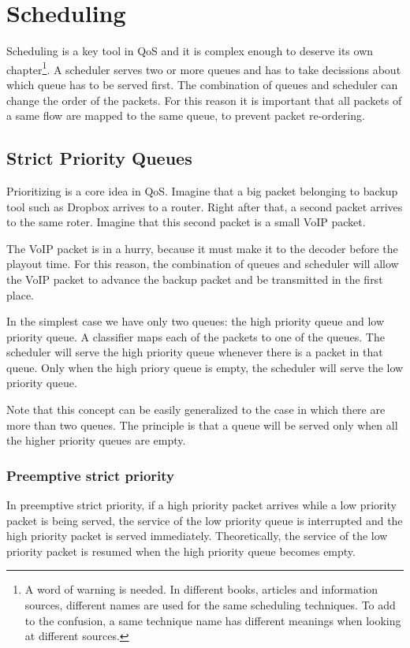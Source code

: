\chapter{Scheduling}

Scheduling is a key tool in QoS and it is complex enough to deserve its own chapter\footnote{A word of warning is needed. In different books, articles and information sources, different names are used for the same scheduling techniques. To add to the confusion, a same technique name has different meanings when looking at different sources.}.
A scheduler serves two or more queues and has to take decissions about which queue has to be served first.
The combination of queues and scheduler can change the order of the packets.
For this reason it is important that all packets of a same flow are mapped to the same queue, to prevent packet re-ordering.

\section{Strict Priority Queues}

Prioritizing is a core idea in QoS.
Imagine that a big packet belonging to backup tool such as Dropbox arrives to a router.
Right after that, a second packet arrives to the same roter.
Imagine that this second packet is a small VoIP packet.

The VoIP packet is in a hurry, because it must make it to the decoder before the playout time.
For this reason, the combination of queues and scheduler will allow the VoIP packet to advance the backup packet and be transmitted in the first place.

In the simplest case we have only two queues: the high priority queue and low priority queue.
A classifier maps each of the packets to one of the queues.
The scheduler will serve the high priority queue whenever there is a packet in that queue.
Only when the high priory queue is empty, the scheduler will serve the low priority queue.

Note that this concept can be easily generalized to the case in which there are more than two queues.
The principle is that a queue will be served only when all the higher priority queues are empty.

\subsection{Preemptive strict priority}
In preemptive strict priority, if a high priority packet arrives while a low priority packet is being served, the service of the low priority queue is interrupted and the high priority packet is served immediately.
Theoretically, the service of the low priority packet is resumed when the high priority queue becomes empty.

